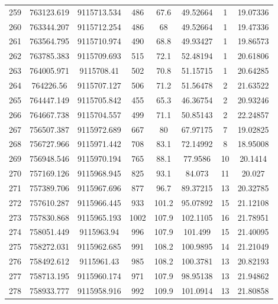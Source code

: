 \begin{longtable}{cccccccc}
259  & 763123.619      & 9115713.534      & 486     & 67.6  & 49.52664 & 1  & 19.07336 \\
260  & 763344.207      & 9115712.254      & 486     & 68    & 49.52664 & 1  & 19.47336 \\
261  & 763564.795      & 9115710.974      & 490     & 68.8  & 49.93427 & 1  & 19.86573 \\
262  & 763785.383      & 9115709.693      & 515     & 72.1  & 52.48194 & 1  & 20.61806 \\
263  & 764005.971      & 9115708.41       & 502     & 70.8  & 51.15715 & 1  & 20.64285 \\
264  & 764226.56       & 9115707.127      & 506     & 71.2  & 51.56478 & 2  & 21.63522 \\
265  & 764447.149      & 9115705.842      & 455     & 65.3  & 46.36754 & 2  & 20.93246 \\
266  & 764667.738      & 9115704.557      & 499     & 71.1  & 50.85143 & 2  & 22.24857 \\
267  & 756507.387      & 9115972.689      & 667     & 80    & 67.97175 & 7  & 19.02825 \\
268  & 756727.966      & 9115971.442      & 708     & 83.1  & 72.14992 & 8  & 18.95008 \\
269  & 756948.546      & 9115970.194      & 765     & 88.1  & 77.9586  & 10 & 20.1414  \\
270  & 757169.126      & 9115968.945      & 825     & 93.1  & 84.073   & 11 & 20.027   \\
271  & 757389.706      & 9115967.696      & 877     & 96.7  & 89.37215 & 13 & 20.32785 \\
272  & 757610.287      & 9115966.445      & 933     & 101.2 & 95.07892 & 15 & 21.12108 \\
273  & 757830.868      & 9115965.193      & 1002    & 107.9 & 102.1105 & 16 & 21.78951 \\
274  & 758051.449      & 9115963.94       & 996     & 107.9 & 101.499  & 15 & 21.40095 \\
275  & 758272.031      & 9115962.685      & 991     & 108.2 & 100.9895 & 14 & 21.21049 \\
276  & 758492.612      & 9115961.43       & 985     & 108.2 & 100.3781 & 13 & 20.82193 \\
277  & 758713.195      & 9115960.174      & 971     & 107.9 & 98.95138 & 13 & 21.94862 \\
278  & 758933.777      & 9115958.916      & 992     & 109.9 & 101.0914 & 13 & 21.80858 \\

\end{longtable}
